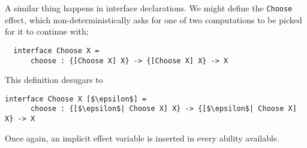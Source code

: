 \documentclass[msc,deptreport,cs]{infthesis} %
\newcommand{\code}[1]{\lstinline{#1}}
\newcommand{\todo}[1]
           {{\par\noindent\small\color{RoyalPurple}
  \framebox{\parbox{\dimexpr\linewidth-2\fboxsep-2\fboxrule}
    {\textbf{TODO:} #1}}}}
\begin{document}
A similar thing happens in interface declarations. We might define the
\code{Choose} effect, which non-deterministically asks for one of two
computations to be picked for it to continue with;

\begin{lstlisting}
  interface Choose X =
      choose : {[Choose X] X} -> {[Choose X] X} -> X
\end{lstlisting}

\noindent This definition desugars to

\begin{lstlisting}[mathescape]
  interface Choose X [$\epsilon$] =
      choose : {[$\epsilon$| Choose X] X} -> {[$\epsilon$| Choose X] X} -> X
\end{lstlisting}

\noindent Once again, an implicit effect variable is inserted in every ability
available.





\end{document}
